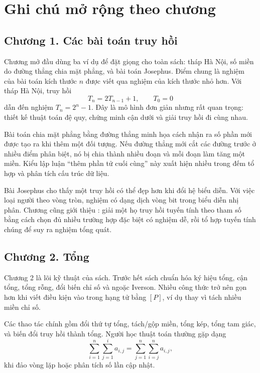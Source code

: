 \documentclass[11pt]{article}
\begin{document}
\section{Ghi chú mở rộng theo chương}

\subsection*{Chương 1. Các bài toán truy hồi}

Chương mở đầu dùng ba ví dụ để đặt giọng cho toàn sách: tháp Hà Nội, số miền
do đường thẳng chia mặt phẳng, và bài toán Josephus. Điểm chung là nghiệm của
bài toán kích thước \(n\) được viết qua nghiệm của kích thước nhỏ hơn. Với tháp
Hà Nội, truy hồi
\[
  T_n = 2T_{n-1}+1,\qquad T_0=0
\]
dẫn đến nghiệm \(T_n=2^n-1\). Đây là mô hình đơn giản nhưng rất quan trọng:
thiết kế thuật toán đệ quy, chứng minh cận dưới và giải truy hồi đi cùng nhau.

Bài toán chia mặt phẳng bằng đường thẳng minh họa cách nhận ra số phần mới
được tạo ra khi thêm một đối tượng. Nếu đường thẳng mới cắt các đường trước ở
nhiều điểm phân biệt, nó bị chia thành nhiều đoạn và mỗi đoạn làm tăng một
miền. Kiểu lập luận ``thêm phần tử cuối cùng'' này xuất hiện nhiều trong đếm
tổ hợp và phân tích cấu trúc dữ liệu.

Bài Josephus cho thấy một truy hồi có thể đẹp hơn khi đổi hệ biểu diễn. Với
việc loại người theo vòng tròn, nghiệm có dạng dịch vòng bit trong biểu diễn
nhị phân. Chương cũng giới thiệu : giải một họ
truy hồi tuyến tính theo tham số bằng cách chọn đủ nhiều trường hợp đặc biệt
có nghiệm dễ, rồi tổ hợp tuyến tính chúng để suy ra nghiệm tổng quát.

\subsection*{Chương 2. Tổng}

Chương 2 là lõi kỹ thuật của sách. Trước hết sách chuẩn hóa ký hiệu tổng, cận
tổng, tổng rỗng, đổi biến chỉ số và ngoặc Iverson. Nhiều công thức trở nên
gọn hơn khi viết điều kiện vào trong hạng tử bằng \([P]\), ví dụ thay vì tách
nhiều miền chỉ số.

Các thao tác chính gồm đổi thứ tự tổng, tách/gộp miền, tổng kép, tổng tam
giác, và biến đổi truy hồi thành tổng. Người học thuật toán thường gặp dạng
\[
  \sum_{i=1}^n \sum_{j=1}^i a_{i,j}
  = \sum_{j=1}^n \sum_{i=j}^n a_{i,j},
\]
khi đảo vòng lặp hoặc phân tích số lần cập nhật.
\end{document}
